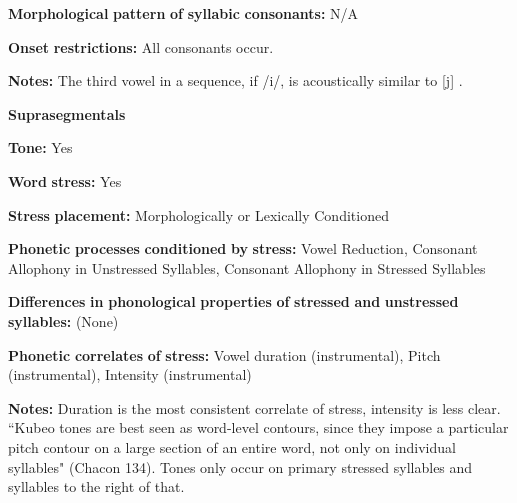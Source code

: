 \documentclass[output=paper]{langsci/langscibook}
\begin{document}
\begin{styleBody}
\textbf{Morphological} \textbf{pattern} \textbf{of} \textbf{syllabic} \textbf{consonants:} N/A
\end{styleBody}

\begin{styleBody}
\textbf{Onset} \textbf{restrictions:} All consonants occur.
\end{styleBody}

\begin{styleBody}
\textbf{Notes:} The third vowel in a sequence, if /i/, is acoustically similar to [j] \citep[52]{Chacon2012}.
\end{styleBody}

\begin{styleBody}
\textbf{Suprasegmentals}
\end{styleBody}

\begin{styleBody}
\textbf{Tone:} Yes
\end{styleBody}

\begin{styleBody}
\textbf{Word} \textbf{stress:} Yes
\end{styleBody}

\begin{styleBody}
\textbf{Stress} \textbf{placement:} Morphologically or Lexically Conditioned
\end{styleBody}

\begin{styleBody}
\textbf{Phonetic} \textbf{processes} \textbf{conditioned} \textbf{by} \textbf{stress:} Vowel Reduction, Consonant Allophony in Unstressed Syllables, Consonant Allophony in Stressed Syllables
\end{styleBody}

\begin{styleBody}
\textbf{Differences} \textbf{in} \textbf{phonological} \textbf{properties} \textbf{of} \textbf{stressed} \textbf{and} \textbf{unstressed} \textbf{syllables:} (None)
\end{styleBody}

\begin{styleBody}
\textbf{Phonetic} \textbf{correlates} \textbf{of} \textbf{stress:} Vowel duration (instrumental), Pitch (instrumental), Intensity (instrumental)
\end{styleBody}

\begin{styleBody}
\textbf{Notes:} Duration is the most consistent correlate of stress, intensity is less clear. “Kubeo tones are best seen as word-level contours, since they impose a particular pitch contour on a large section of an entire word, not only on individual syllables" (Chacon 134). Tones only occur on primary stressed syllables and syllables to the right of that.
\end{styleBody}
\end{document}

